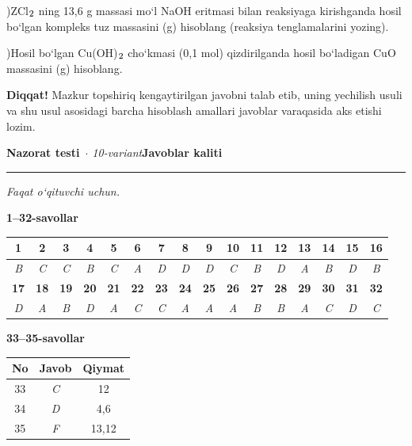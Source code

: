 \documentclass[11pt,a4paper]{article}
\renewcommand{\textsubscript}[1]{\ensuremath{_{\text{\fontsize{8}{8}\selectfont #1}}}}
\newcommand{\diqqat}[1]{\par\smallskip\noindent\textbf{Diqqat!} #1\par\medskip}
\begin{document}
)ZCl\textsubscript{2} ning 13,6 g massasi mo`l NaOH eritmasi bilan reaksiyaga kirishganda hosil bo`lgan kompleks tuz massasini (g) hisoblang (reaksiya tenglamalarini yozing).\par
{})Hosil bo`lgan Cu(OH)\textsubscript{2} cho`kmasi (0,1 mol) qizdirilganda hosil bo`ladigan CuO massasini (g) hisoblang.\par
\diqqat{Mazkur topshiriq kengaytirilgan javobni talab etib, uning yechilish usuli va shu usul asosidagi barcha hisoblash amallari javoblar varaqasida aks etishi lozim.}
\newpage
\noindent\textbf{\fontsize{13}{15}\selectfont Nazorat testi}\ \textit{$\cdot$ 10-variant}\hfill \textbf{Javoblar kaliti}\par\smallskip\hrule\smallskip
\textit{Faqat o`qituvchi uchun.}\par\medskip
\noindent\textbf{1--32-savollar}\par\smallskip
\noindent\begin{tabular}{|c|c|c|c|c|c|c|c|c|c|c|c|c|c|c|c|}\hline
\textbf{1} & \textbf{2} & \textbf{3} & \textbf{4} & \textbf{5} & \textbf{6} & \textbf{7} & \textbf{8} & \textbf{9} & \textbf{10} & \textbf{11} & \textbf{12} & \textbf{13} & \textbf{14} & \textbf{15} & \textbf{16}\\\hline
\textsl{B} & \textsl{C} & \textsl{C} & \textsl{B} & \textsl{C} & \textsl{A} & \textsl{D} & \textsl{D} & \textsl{D} & \textsl{C} & \textsl{B} & \textsl{D} & \textsl{A} & \textsl{B} & \textsl{D} & \textsl{B}\\\hline
\textbf{17} & \textbf{18} & \textbf{19} & \textbf{20} & \textbf{21} & \textbf{22} & \textbf{23} & \textbf{24} & \textbf{25} & \textbf{26} & \textbf{27} & \textbf{28} & \textbf{29} & \textbf{30} & \textbf{31} & \textbf{32}\\\hline
\textsl{D} & \textsl{A} & \textsl{B} & \textsl{D} & \textsl{A} & \textsl{C} & \textsl{C} & \textsl{A} & \textsl{A} & \textsl{A} & \textsl{B} & \textsl{B} & \textsl{A} & \textsl{C} & \textsl{D} & \textsl{C}\\\hline
\end{tabular}\par\medskip
\noindent\textbf{33--35-savollar}\par\smallskip
\noindent\begin{tabular}{|c|c|c|}\hline \textbf{No} & \textbf{Javob} & \textbf{Qiymat}\\\hline
33 & \textsl{C} & 12\\\hline
34 & \textsl{D} & 4,6\\\hline
35 & \textsl{F} & 13,12\\\hline
\end{tabular}\par\medskip
\end{document}
